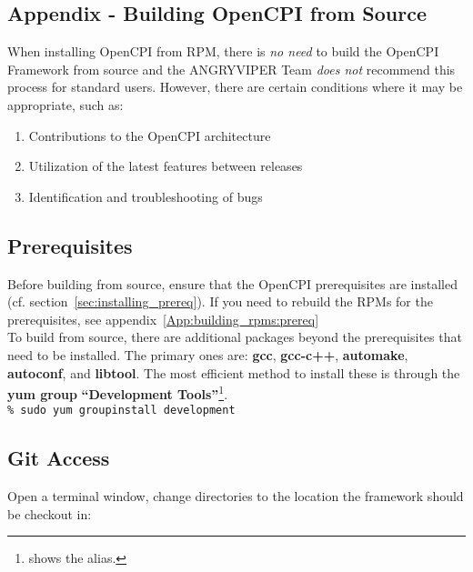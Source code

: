 \begin{appendices}
\section{Appendix - Building OpenCPI from Source}

\label{App:install_from_source}
When installing OpenCPI from RPM, there is \textit{no need} to build the OpenCPI Framework from source and the ANGRYVIPER Team \textit{does not} recommend this process for standard users. However, there are certain conditions where it may be appropriate, such as:
\begin{enumerate}
\item Contributions to the OpenCPI architecture
\item Utilization of the latest features between releases
\item Identification and troubleshooting of bugs
\end{enumerate}

\begin{center}
\end{center}

\subsection{Prerequisites}
\label{subsec:build_prereq}
Before building from source, ensure that the OpenCPI prerequisites are installed (cf. section~\ref{sec:installing_prereq}). If you need to rebuild the RPMs for the prerequisites, see appendix~\ref{App:building_rpms:prereq}\\

To build from source, there are additional packages beyond the prerequisites that need to be installed. The primary ones are: \textbf{gcc}, \textbf{gcc-c++}, \textbf{automake}, \textbf{autoconf}, and \textbf{libtool}.  The most efficient method to install these is through the \textbf{yum group} \textbf{``Development Tools''}\footnote{ shows the  alias.}.\\

\verb+% sudo yum groupinstall development+

\subsection{Git Access}
Open a terminal window, change directories to the location the framework should be checkout in:\\


\end{appendices}
